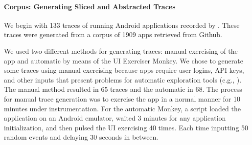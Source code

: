 \documentclass[10pt,reprint,nocopyrightspace,numbers]{sigplanconf}
\begin{document}
\paragraph{Corpus: Generating Sliced and Abstracted Traces}

We begin with 133 traces of running Android applications recorded by \toolname{}.
These traces were generated from a corpus of 1909 apps retrieved from Github.

We used two different methods for generating traces: manual exercising of the app and automatic by means of the
UI Exerciser Monkey.
We chose to generate some traces using manual exercising because apps require user logins, API keys, and other inputs that present problems for automatic exploration tools
(e.g., \cite{DBLP:conf/sigsoft/MachiryTN13,DBLP:conf/oopsla/AzimN13,DBLP:conf/kbse/AmalfitanoFTCM12}).
The manual method resulted in 65 traces and the automatic in 68.
%
The process for manual trace generation was to exercise the app in a normal manner for 10 minutes under instrumentation. For the automatic Monkey, a script loaded the application on an Android emulator, waited 3 minutes for any application initialization, and then pulsed the UI exercising 40 times. Each time inputting 50 random events and delaying 30 seconds in between.
\end{document}
